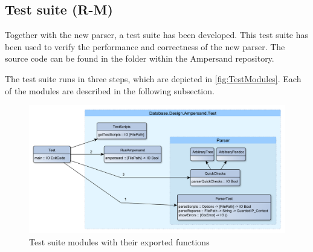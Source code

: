 
\subsection{Test suite (R-M)}
  Together with the new parser, a test suite has been developed.
  This test suite has been used to verify the performance and correctness of the new parser.
  The source code can be found in the folder  within the Ampersand repository.

  The test suite runs in three steps, which are depicted in \autoref{fig:TestModules}.
  Each of the modules are described in the following subsection.
  \begin{figure}[ht]%
    \includegraphics[width=\columnwidth]{Figures/TestModules}
    \caption{Test suite modules with their exported functions}
    \label{fig:TestModules}
  \end{figure}%


